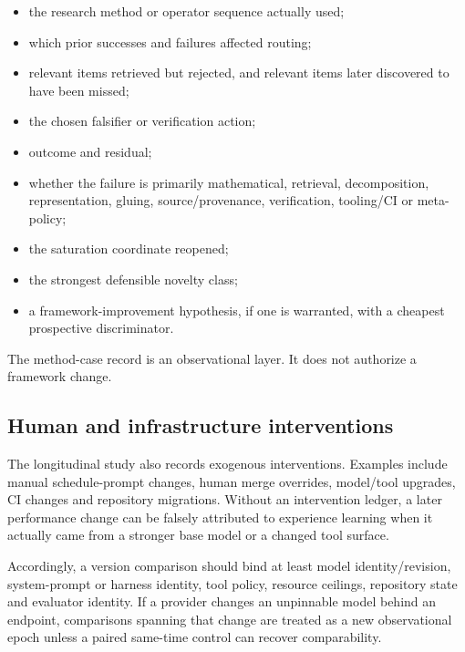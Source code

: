\begin{itemize}[leftmargin=*]
\item the research method or operator sequence actually used;
\item which prior successes and failures affected routing;
\item relevant items retrieved but rejected, and relevant items later discovered to have been missed;
\item the chosen falsifier or verification action;
\item outcome and residual;
\item whether the failure is primarily mathematical, retrieval, decomposition, representation, gluing, source/provenance, verification, tooling/CI or meta-policy;
\item the saturation coordinate reopened;
\item the strongest defensible novelty class;
\item a framework-improvement hypothesis, if one is warranted, with a cheapest prospective discriminator.
\end{itemize}

The method-case record is an observational layer. It does not authorize a framework change.

\subsection{Human and infrastructure interventions}

The longitudinal study also records exogenous interventions. Examples include manual schedule-prompt changes, human merge overrides, model/tool upgrades, CI changes and repository migrations. Without an intervention ledger, a later performance change can be falsely attributed to experience learning when it actually came from a stronger base model or a changed tool surface.

Accordingly, a version comparison should bind at least model identity/revision, system-prompt or harness identity, tool policy, resource ceilings, repository state and evaluator identity. If a provider changes an unpinnable model behind an endpoint, comparisons spanning that change are treated as a new observational epoch unless a paired same-time control can recover comparability.
